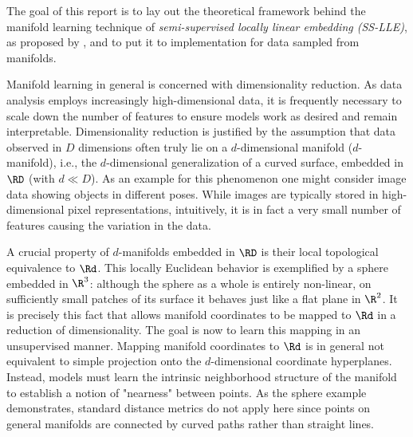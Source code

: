 The goal of this report is to lay out the theoretical framework behind the 
manifold learning technique of \textit{semi-supervised locally linear embedding 
(SS-LLE)}, as proposed by \citet{yangetal2006}, and to put it to implementation 
for data sampled from manifolds.

Manifold learning in general is concerned with dimensionality reduction.
As data analysis employs increasingly high-dimensional data, it is frequently
necessary to scale down the number of features to ensure models work as desired
and remain interpretable.
Dimensionality reduction is justified by the assumption that data observed in
$D$ dimensions often truly lie on a $d$-dimensional manifold ($d$-manifold), 
i.e., the $d$-dimensional generalization of a curved surface, embedded in 
$\RD$ (with $d \ll D$).
As an example for this phenomenon one might consider image data showing objects 
in different poses.
While images are typically stored in high-dimensional pixel representations,
intuitively, it is in fact a very small number of features causing the
variation in the data.

A crucial property of $d$-manifolds embedded in $\RD$ is their local topological 
equivalence to $\Rd$.
This locally Euclidean behavior is exemplified by a sphere embedded in $\R^3$: 
although the sphere as a whole is entirely non-linear, on sufficiently small 
patches of its surface it behaves just like a flat plane in $\R^2$.
It is precisely this fact that allows manifold coordinates to be mapped to 
$\Rd$ in a reduction of dimensionality.
The goal is now to learn this mapping in an unsupervised manner.
Mapping manifold coordinates to $\Rd$ is in general not equivalent to simple 
projection onto the $d$-dimensional coordinate hyperplanes.
Instead, models must learn the intrinsic neighborhood structure of the manifold
to establish a notion of "nearness" between points.
As the sphere example demonstrates, standard distance metrics do not apply here 
since points on general manifolds are connected by curved paths rather 
than straight lines.

